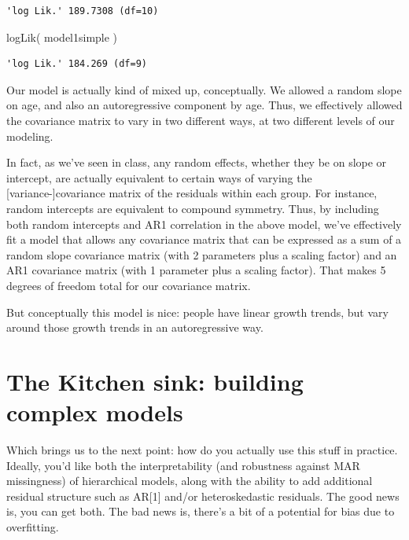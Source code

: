 \documentclass[
  letterpaper,
  DIV=11,
  numbers=noendperiod]{scrreprt}
\newenvironment{Shaded}{\begin{snugshade}}{\end{snugshade}}
\newcommand{\FunctionTok}[1]{\textcolor[rgb]{0.02,0.16,0.49}{#1}}
\newcommand{\NormalTok}[1]{\textcolor[rgb]{0.00,0.44,0.13}{#1}}
\begin{document}
\begin{verbatim}
'log Lik.' 189.7308 (df=10)
\end{verbatim}

\begin{Shaded}
\begin{Highlighting}[]
\FunctionTok{logLik}\NormalTok{( model1simple )}
\end{Highlighting}
\end{Shaded}

\begin{verbatim}
'log Lik.' 184.269 (df=9)
\end{verbatim}

Our model is actually kind of mixed up, conceptually. We allowed a
random slope on age, and also an autoregressive component by age. Thus,
we effectively allowed the covariance matrix to vary in two different
ways, at two different levels of our modeling.

In fact, as we've seen in class, any random effects, whether they be on
slope or intercept, are actually equivalent to certain ways of varying
the {[}variance-{]}covariance matrix of the residuals within each group.
For instance, random intercepts are equivalent to compound symmetry.
Thus, by including both random intercepts and AR1 correlation in the
above model, we've effectively fit a model that allows any covariance
matrix that can be expressed as a sum of a random slope covariance
matrix (with 2 parameters plus a scaling factor) and an AR1 covariance
matrix (with 1 parameter plus a scaling factor). That makes 5 degrees of
freedom total for our covariance matrix.

But conceptually this model is nice: people have linear growth trends,
but vary around those growth trends in an autoregressive way.

\hypertarget{the-kitchen-sink-building-complex-models}{%
\section{The Kitchen sink: building complex
models}\label{the-kitchen-sink-building-complex-models}}

Which brings us to the next point: how do you actually use this stuff in
practice. Ideally, you'd like both the interpretability (and robustness
against MAR missingness) of hierarchical models, along with the ability
to add additional residual structure such as AR{[}1{]} and/or
heteroskedastic residuals. The good news is, you can get both. The bad
news is, there's a bit of a potential for bias due to overfitting.
\end{document}
